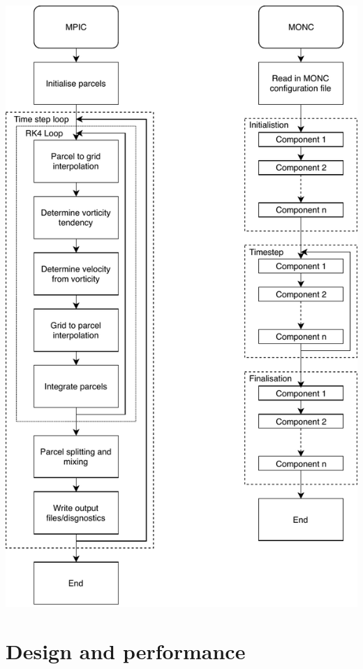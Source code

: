 \documentclass{beamer}
\begin{document}
\begin{frame}[plain]
  \begin{center}
    \includegraphics[scale=0.42]{pmpic_images/flowchart.pdf}
  \end{center}
\end{frame}

\section{Design and performance}
\end{document}
